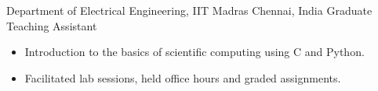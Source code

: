 
        {Department of Electrical Engineering, IIT Madras}
        {Chennai, India}
        {Graduate Teaching Assistant}
        {}{
    \begin{itemize}
        \item Introduction to the basics of scientific computing using C and Python.
        \item Facilitated lab sessions, held office hours and graded assignments.
    \end{itemize}
}
